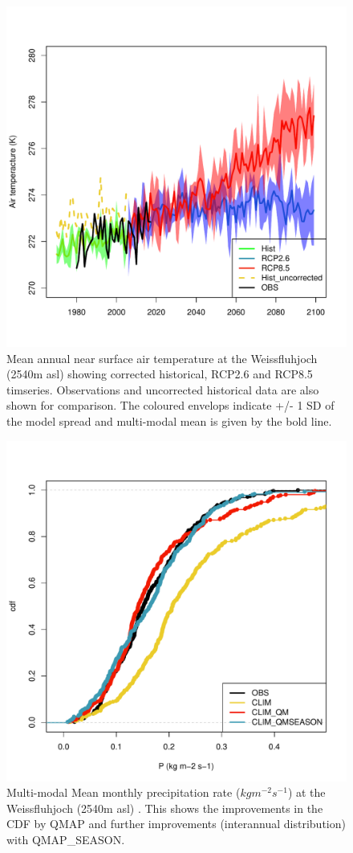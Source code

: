 \documentclass[hess, manuscript]{copernicus}
\begin{document}
\begin{figure}[t]
\includegraphics[width=12cm]{"plots/TA_TS.pdf"}
\caption{Mean annual near surface air temperature at the Weissfluhjoch (2540m asl)  showing corrected historical, RCP2.6 and RCP8.5 timseries. Observations and uncorrected historical data are also shown for comparison. The coloured envelops indicate +/- 1 SD of the model spread and multi-modal mean is given by the bold line. }
\end{figure}

\begin{figure}[t]
\includegraphics[width=12cm]{"plots/P_CDF.pdf"}
\caption{Multi-modal Mean monthly precipitation rate ($kg m^{-2} s^{-1}$) at the Weissfluhjoch (2540m asl) . This shows the improvements in the CDF by QMAP and further improvements (interannual distribution) with QMAP\_SEASON. }
\end{figure}
\end{document}

